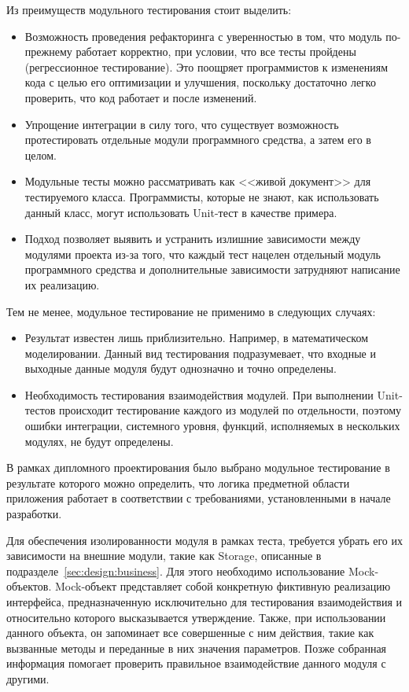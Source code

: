 Из преимуществ модульного тестирования стоит выделить:

\begin{itemize}
    \item Возможность проведения рефакторинга с уверенностью в том, что модуль по-прежнему работает корректно, при условии, что все тесты пройдены (регрессионное тестирование).
    Это поощряет программистов к изменениям кода с целью его оптимизации и улучшения, поскольку достаточно легко проверить, что код работает и после изменений.
    \item Упрощение интеграции в силу того, что существует возможность протестировать отдельные модули программного средства, а затем его в целом.
    \item Модульные тесты можно рассматривать как <<живой документ>> для тестируемого класса.
    Программисты, которые не знают, как использовать данный класс, могут использовать Unit-тест в качестве примера.
    \item Подход позволяет выявить и устранить излишние зависимости между модулями проекта из-за того, что каждый тест нацелен отдельный модуль программного средства и дополнительные зависимости затрудняют написание их реализацию.
\end{itemize}

Тем не менее, модульное тестирование не применимо в следующих случаях:

\begin{itemize}
    \item Результат известен лишь приблизительно.
    Например, в математическом моделировании.
    Данный вид тестирования подразумевает, что входные и выходные данные модуля будут однозначно и точно определены.
    \item Необходимость тестирования взаимодействия модулей.
    При выполнении Unit-тестов происходит тестирование каждого из модулей по отдельности, поэтому ошибки интеграции, системного уровня, функций, исполняемых в нескольких модулях, не будут определены.
\end{itemize}

В рамках дипломного проектирования было выбрано модульное тестирование в результате которого можно определить, что логика предметной области приложения работает в соответствии с требованиями, установленными в начале разработки.

Для обеспечения изолированности модуля в рамках теста, требуется убрать его их зависимости на внешние модули, такие как Storage, описанные в подразделе~\ref{sec:design:business}.
Для этого необходимо использование Mock-объектов.
Mock-объект представляет собой конкретную фиктивную реализацию интерфейса, предназначенную исключительно для тестирования взаимодействия и относительно которого высказывается утверждение.
Также, при использовании данного объекта, он запоминает все совершенные с ним действия, такие как вызванные методы и переданные в них значения параметров.
Позже собранная информация помогает проверить правильное взаимодействие данного модуля с другими.

